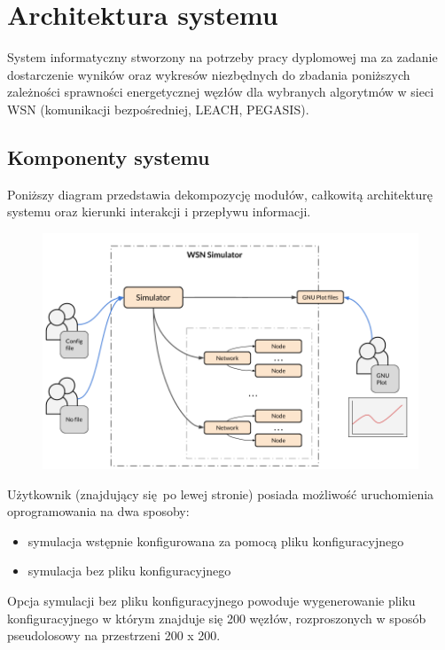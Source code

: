 \documentclass[a4paper,12pt,twoside,openany]{report}
\begin{document}
\chapter{Architektura systemu}

System informatyczny stworzony na potrzeby pracy dyplomowej ma za zadanie dostarczenie wyników oraz wykresów niezbędnych do zbadania poniższych zależności sprawności energetycznej 
węzłów dla wybranych algorytmów w sieci WSN (komunikacji bezpośredniej, LEACH, PEGASIS).

\section{Komponenty systemu}

Poniższy diagram przedstawia dekompozycję modułów, całkowitą architekturę systemu oraz kierunki interakcji i przepływu informacji.

\begin{figure}[H]
 \centering
 \includegraphics[width=13cm]{images/architektura_systemu.png} 
\end{figure}

Użytkownik (znajdujący się po lewej stronie) posiada możliwość uruchomienia oprogramowania na dwa sposoby: 

\begin{itemize}
 \item symulacja wstępnie konfigurowana za pomocą pliku konfiguracyjnego
 \item symulacja bez pliku konfiguracyjnego
\end{itemize}

Opcja symulacji bez pliku konfiguracyjnego powoduje wygenerowanie pliku konfiguracyjnego w którym znajduje się 200 węzłów, rozproszonych w sposób
pseudolosowy na przestrzeni 200 x 200.
\end{document}
